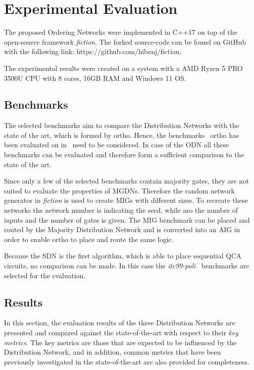 \chapter{Experimental Evaluation}\label{chapter:ExpEval}

The proposed Ordering Networks were implemented in C++17 on top of the open-source framework \textit{fiction}. The forked source-code can be found on GitHub with the following link: https://github.com/hibenj/fiction. 

The experimental results were created on a system with a AMD Ryzen 5 PRO 3500U CPU with 8 cores, 16GB RAM and Windows 11 OS.

\section{Benchmarks}
The selected benchmarks aim to compare the Distribution Networks with the state of the art, which is formed by ortho. Hence, the benchmarks~\cite{fontes, trindade2016placement, epfl, iscas} ortho has been evaluated on in~\cite{ortho} need to be considered. In case of the ODN all these benchmarks can be evaluated and therefore form a sufficient comparison to the state of the art.

Since only a few of the selected benchmarks contain majority gates, they are not suited to evaluate the properties of MGDNs. Therefore the random network generator in \textit{fiction} is used to create MIGs with different sizes. To recreate these networks the network number is indicating the seed, while aso the number of inputs and the number of gates is given. The MIG benchmark can be placed and routed by the Majority Distribution Network and is converted into an AIG in order to enable ortho to place and route the same logic.

Because the SDN is the first algorithm, which is able to place sequential QCA circuits, no comparison can be made. In this case the \textit{itc99-poli}~\cite{itc_poli} benchmarks are selected for the evaluation.

\section{Results}
In this section, the evaluation results of the three Distribution Networks are presented and compared against the state-of-the-art with respect to their \textit{key metrics}. The key metrics are those that are expected to be influenced by the Distribution Network, and in addition, common metrics that have been previously investigated in the state-of-the-art are also provided for completeness.

